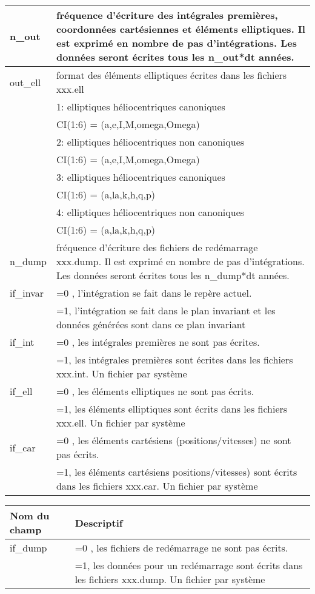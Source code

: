 \documentclass[11pt]{article}
\begin{document}
\begin{tabularx}{\textwidth}{|l|X|}
 n\_out & fr\'equence d'\'ecriture des int\'egrales premi\`eres, coordonn\'ees cart\'esiennes et \'el\'ements elliptiques. Il est exprim\'e en nombre de pas d'int\'egrations. Les donn\'ees seront \'ecrites tous les n\_out*dt ann\'ees.
 \\ \hline
 out\_ell & format des \'el\'ements elliptiques \'ecrites dans les fichiers xxx.ell \\
&1:  elliptiques h\'eliocentriques canoniques\\
&	     CI(1:6) = (a,e,I,M,omega,Omega)\\
&2:  elliptiques h\'eliocentriques non canoniques\\
&	     CI(1:6) = (a,e,I,M,omega,Omega)\\
&3:  elliptiques h\'eliocentriques canoniques\\
&	     CI(1:6) = (a,la,k,h,q,p)\\
&4:  elliptiques h\'eliocentriques non canoniques\\
&	     CI(1:6) = (a,la,k,h,q,p)\\ \hline
 n\_dump & fr\'equence d'\'ecriture des fichiers de red\'emarrage xxx.dump. Il est exprim\'e en nombre de pas d'int\'egrations. Les donn\'ees seront \'ecrites tous les n\_dump*dt ann\'ees.
 \\ \hline
 if\_invar & =0 , l'int\'egration se fait dans le rep\`ere actuel. \\
& =1, l'int\'egration se fait dans le plan invariant et les donn\'ees g\'en\'er\'ees sont dans ce plan invariant 
\\ \hline

 if\_int & =0 , les int\'egrales premi\`eres ne sont pas \'ecrites.\\
&=1, les int\'egrales premi\`eres sont \'ecrites dans les fichiers xxx.int. Un fichier par syst\`eme\\ \hline
 
 if\_ell & =0 , les \'el\'ements elliptiques ne sont pas \'ecrits.\\
&=1, les \'el\'ements elliptiques sont \'ecrits dans les fichiers xxx.ell. Un fichier par syst\`eme\\ \hline
 
 if\_car &  =0 , les \'el\'ements cart\'esiens (positions/vitesses) ne sont pas \'ecrits.\\
&=1, les \'el\'ements cart\'esiens positions/vitesses) sont \'ecrits dans les fichiers xxx.car. Un fichier par syst\`eme\\ \hline 
 \end{tabularx}
\begin{tabularx}{\textwidth}{|l|X|}
	\hline
	Nom du champ& Descriptif \\ \hline 
 if\_dump &  =0 , les fichiers de red\'emarrage ne sont pas \'ecrits.\\
&=1, les donn\'ees pour un red\'emarrage sont \'ecrits dans les fichiers xxx.dump. Un fichier par syst\`eme\\ \hline 
 \end{tabularx}
\end{document}
